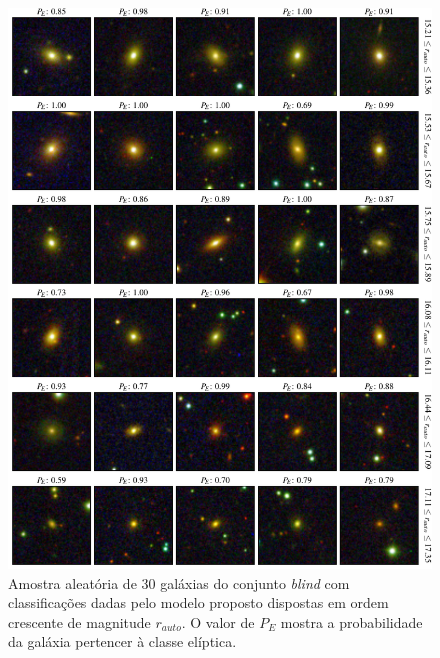 \begin{figure}[!ht]
  \centering
  \includegraphics[width=0.95\linewidth]{figures/blind_preds_ellip_2.pdf}
  \caption{Amostra aleatória de 30 galáxias do conjunto \emph{blind} com classificações dadas pelo modelo proposto dispostas em ordem crescente de magnitude $r_{auto}$. O valor de $P_E$ mostra a probabilidade da galáxia pertencer à classe elíptica.}
  \label{fig:grid-e2}
\end{figure}